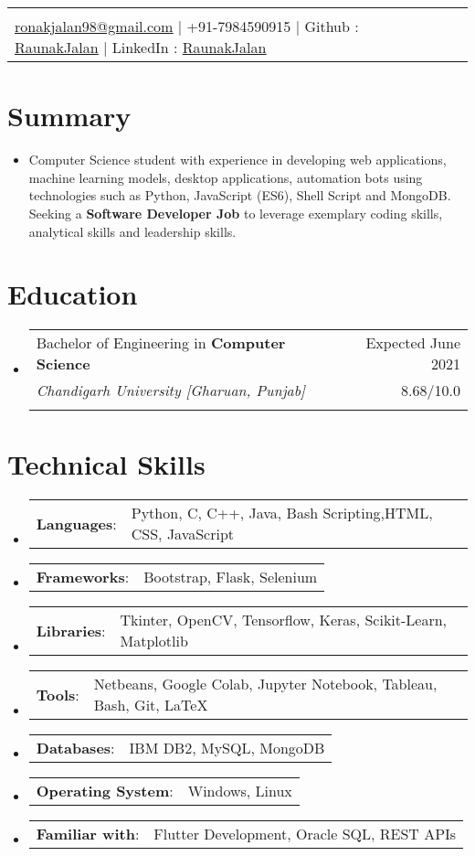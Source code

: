 \documentclass[letterpaper,11pt]{article}
\makeatletter
\newcommand{\sectionStart}{
  \begin{itemize}[label={},leftmargin=0in]
}
\newcommand{\sectionEnd}{
  \end{itemize}
}
\newcommand{\head}[8]{
  \noindent
  \begin{tabular*}{\textwidth}{l@{\extracolsep{\fill}}r}
    \centerline{
      \textbf{{\color{black}{\LARGE {\underline{#1}}}}}
    }
    \vspace{5pt}\\
    \centerline{
      \href{mailto:#2}{\underline{#2}} $\mid$
      #3 $\mid$
      #4 : \href{#5}{\underline{#6}} $\mid$
      #7 : \href{#8}{\underline{#6}}
    }
  \end{tabular*}
  \vspace{-10pt}
}
\newcommand{\summaryText}[1]{
  \item
  \begin{addmargin}[7pt]{0pt}
    {#1}
  \end{addmargin}
}
\newcommand{\educationItem}[5]{
  \vspace{-1pt}
  \item
  \begin{tabular*}{\textwidth}{l@{\extracolsep{\fill}}r@{}}
    {#1 in \textbf{#2}}  & {#3}\\
    {\textit{#4}} & {#5}\\\vspace{-18pt}
  \end{tabular*}
  \vspace{-5pt}
}
\newcommand{\skillItem}[2]{
  \vspace{-1pt}
  \item
  \begin{tabular*}{1.0\textwidth}{l@{}l@{}}
    {\textbf{#1}: } & {#2}
  \end{tabular*}\vspace{-17pt}
}
\makeatother
\begin{document}
\head
  {Raunak Jalan}
  {ronakjalan98@gmail.com}
  {+91-7984590915}
  {Github}
  {https://github.com/RaunakJalan}
  {RaunakJalan}
  {LinkedIn}
  {https://www.linkedin.com/in/raunak-jalan-dev/}

\section{Summary}
\sectionStart
  \summaryText
  {Computer Science student with experience in developing web applications, machine learning models, desktop applications, automation bots using technologies such as Python, JavaScript (ES6), Shell Script and MongoDB. Seeking a \textbf{Software Developer Job} to leverage exemplary coding skills, analytical skills and leadership skills.}
\sectionEnd

\section{Education}
\sectionStart
  \educationItem
    {Bachelor of Engineering} 
    {Computer Science} 
    {Expected June 2021}
    {Chandigarh University [Gharuan, Punjab]} 
    {8.68/10.0}
\sectionEnd

\section{Technical Skills}
\sectionStart
  \skillItem
    {Languages}
    {Python, C, C++, Java, Bash Scripting,HTML, CSS,  JavaScript}
  \skillItem
    {Frameworks}
    {Bootstrap, Flask, Selenium}
  \skillItem
    {Libraries}
    {Tkinter, OpenCV, Tensorflow, Keras, Scikit-Learn, Matplotlib}
  \skillItem
    {Tools}
    {Netbeans, Google Colab, Jupyter Notebook, Tableau, Bash, Git, \LaTeX\ }
  \skillItem
    {Databases}
    {IBM DB2, MySQL, MongoDB}
  \skillItem
    {Operating System}
    {Windows, Linux}
  \skillItem
    {Familiar with}
    {Flutter Development, Oracle SQL, REST APIs}
  \vspace{3pt}
\sectionEnd

\end{document}
